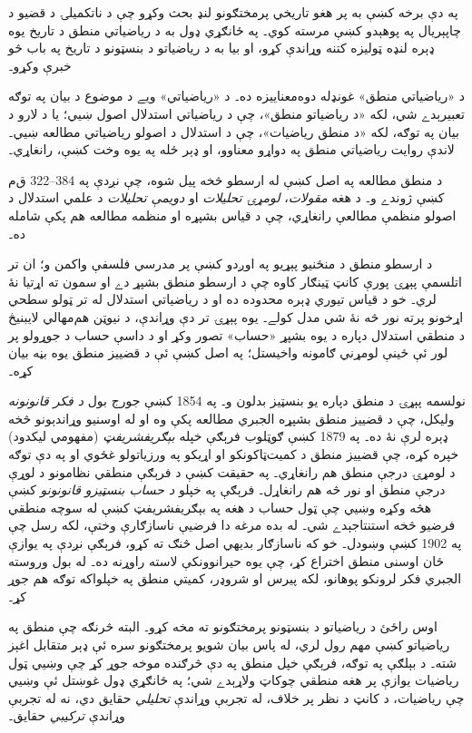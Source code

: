 \documentclass[../../../include/open-logic-section]{subfiles}
\begin{document}


په دې برخه کښې به پر هغو تاريخي پرمختګونو لنډ بحث وکړو چې د
ناتکميلۍ د قضيو د چاپېريال په پوهېدو کښې مرسته کوي۔ په ځانګړي ډول به
د رياضياتي منطق د تاريخ يوه ډېره لنډه ټوليزه کتنه وړاندې کړو، او بيا
به د رياضياتو د بنسټونو د تاريخ په باب څو خبرې وکړو۔

\begin{digress}
  د «رياضياتي منطق» غونډله دوه‌معناييزه ده۔ د «رياضياتي» ويے د موضوع
  د بيان په توګه تعبيرېدے شي، لکه «د رياضياتو منطق»، چې د رياضياتي
  استدلال اصول ښيي؛ يا د لارو د بيان په توګه، لکه «د منطق رياضيات»،
  چې د استدلال د اصولو رياضياتي مطالعه ښيي۔ لاندې روايت رياضياتي منطق
  په دواړو معناوو، او ډېر ځله په يوه وخت کښې، رانغاړي۔
\end{digress}

د منطق مطالعه په اصل کښې له ارسطو څخه پيل شوه، چې نږدې په
384--322 \textsc{ق‌م} کښې ژوندے و۔ د هغه \emph{مقولات}،
\emph{لومړۍ تحليلات} او \emph{دويمې تحليلات} د علمي استدلال د اصولو
منظمې مطالعې رانغاړي، چې د قياس بشپړه او منظمه مطالعه هم پکې شامله ده۔

د ارسطو منطق د منځنيو پېړيو په اوږدو کښې پر مدرسي فلسفې واکمن و؛ ان
تر اتلسمې پېړۍ پورې کانټ ټينګار کاوه چې د ارسطو منطق بشپړ دے او
سمون ته اړتيا نۀ لري۔ خو د قياس تيوري ډېره محدوده ده او د رياضياتي
استدلال له تر ټولو سطحي اړخونو پرته نور څه نۀ شي مدل کولے۔ يوه پېړۍ
تر دې وړاندې، د نيوټن هم‌مهالي لايبنيڅ د منطقي استدلال دپاره د يوه
بشپړ «حساب» تصور وکړ او د داسې حساب د جوړولو پر لور ئې ځينې لومړني
ګامونه واخيستل؛ په اصل کښې ئې د قضييز منطق يوه بڼه بيان کړه۔

نولسمه پېړۍ د منطق دپاره يو بنسټيز بدلون و۔ په 1854 کښې جورج بول
\emph{د فکر قانونونه} وليکل، چې د قضييز منطق بشپړه الجبري مطالعه
پکې وه او له اوسنيو وړاندېونو څخه ډېره لرې نۀ ده۔ په 1879 کښې ګوټلوب
فرېګې خپله \emph{بېګريفشريفټ} (مفهومي ليکدود) خپره کړه، چې قضييز
منطق د کميت‌ټاکونکو او اړيکو په ورزياتولو غځوي او په دې توګه د لومړۍ
درجې منطق هم رانغاړي۔ په حقيقت کښې د فرېګې منطقي نظامونو د لوړې درجې
منطق او نور څه هم رانغاړل۔ فرېګې په خپلو \emph{د حساب بنسټيزو
قانونونو} کښې هڅه وکړه وښيي چې ټول حساب د هغه په بېګريفشريفټ کښې له
سوچه منطقي فرضيو څخه استنتاجېدے شي۔ له بده مرغه دا فرضيې ناسازګارې
وختې، لکه رسل چې په 1902 کښې وښودل۔ خو که ناسازګار بديهي اصل څنګ ته
کړو، فرېګې نږدې په يوازې ځان اوسنی منطق اختراع کړ، چې يوه حيرانوونکې
لاسته راوړنه ده۔ له بول وروسته الجبري فکر لرونکو پوهانو، لکه پيرس او
شروډر، کميتي منطق په خپلواکه توګه هم جوړ کړ۔

اوس راځئ د رياضياتو د بنسټونو پرمختګونو ته مخه کړو۔ البته څرنګه چې
منطق په رياضياتو کښې مهم رول لري، له پاس بيان شويو پرمختګونو سره ئې
ډېر متقابل اغېز شته۔ د بېلګې په توګه، فرېګې خپل منطق په دې څرګنده
موخه جوړ کړ چې وښيي ټول رياضيات يوازې پر هغه منطقي چوکاټ ولاړېدے شي؛
په ځانګړي ډول غوښتل ئې وښيي چې رياضيات، د کانټ د نظر پر خلاف، له
تجربې وړاندې \emph{تحليلي} حقايق دي، نه له تجربې وړاندې
\emph{ترکيبي} حقايق۔
\end{document}
